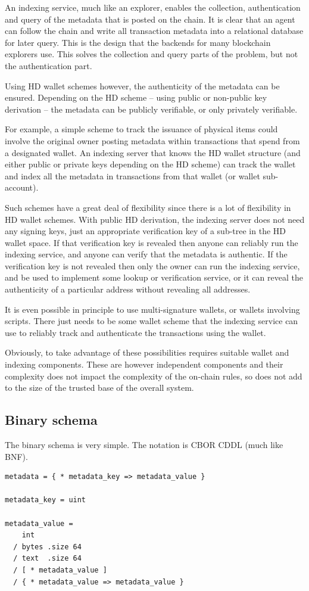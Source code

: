 \documentclass[11pt,a4paper,dvipsnames,twosided]{article}
\begin{document}
An indexing service, much like an explorer, enables the collection,
authentication and query of the metadata that is posted on the chain. It is
clear that an agent can follow the chain and write all transaction metadata
into a relational database for later query. This is the design that the
backends for many blockchain explorers use. This solves the collection and
query parts of the problem, but not the authentication part.

Using HD wallet schemes however, the authenticity of the metadata can be
ensured. Depending on the HD scheme -- using public or non-public key
derivation -- the metadata can be publicly verifiable, or only privately
verifiable.

For example, a simple scheme to track the issuance of physical items could
involve the original owner posting metadata within transactions that spend from
a designated wallet. An indexing server that knows the HD wallet structure (and
either public or private keys depending on the HD scheme) can track the wallet
and index all the metadata in transactions from that wallet (or wallet
sub-account).

Such schemes have a great deal of flexibility since there is a lot of
flexibility in HD wallet schemes. With public HD derivation, the indexing
server does not need any signing keys, just an appropriate verification key of
a sub-tree in the HD wallet space. If that verification key is revealed then
anyone can reliably run the indexing service, and anyone can verify that the
metadata is authentic. If the verification key is not revealed then only the
owner can run the indexing service, and be used to implement some lookup or
verification service, or it can reveal the authenticity of a particular address
without revealing all addresses.

It is even possible in principle to use multi-signature wallets, or wallets
involving scripts. There just needs to be some wallet scheme that the indexing
service can use to reliably track and authenticate the transactions using the
wallet.

Obviously, to take advantage of these possibilities requires suitable wallet
and indexing components. These are however independent components and their
complexity does not impact the complexity of the on-chain rules, so does not
add to the size of the trusted base of the overall system.

\subsection{Binary schema}

The binary schema is very simple. The notation is CBOR CDDL (much like BNF).

\begin{verbatim}
metadata = { * metadata_key => metadata_value }

metadata_key = uint

metadata_value =
    int
  / bytes .size 64
  / text  .size 64
  / [ * metadata_value ]
  / { * metadata_value => metadata_value }
\end{verbatim}

%


\end{document}
